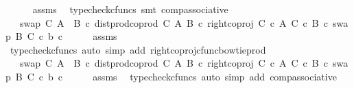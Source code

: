 \begin{isabellebody}
\ \ \ \ \isamarkupfalse%
\ assms\ \isamarkupfalse%
\ {\isacharparenleft}{\kern0pt}typecheck{\isacharunderscore}{\kern0pt}cfuncs{\isacharcomma}{\kern0pt}\ smt\ comp{\isacharunderscore}{\kern0pt}associative{}{\isacharparenright}{\kern0pt}\isanewline
\ \ \isamarkupfalse%
\ \isamarkupfalse%
\ {\isachardoublequoteopen}{\isachardot}{\kern0pt}{\isachardot}{\kern0pt}{\isachardot}{\kern0pt}\ {\isacharequal}{\kern0pt}\ swap\ C\ {\isacharparenleft}{\kern0pt}A\ {\isasymCoprod}\ B{\isacharparenright}{\kern0pt}\ {\isasymcirc}\isactrlsub c\ dist{\isacharunderscore}{\kern0pt}prod{\isacharunderscore}{\kern0pt}coprod\ C\ A\ B\ {\isasymcirc}\isactrlsub c\ {\isacharparenleft}{\kern0pt}right{\isacharunderscore}{\kern0pt}coproj\ {\isacharparenleft}{\kern0pt}C\ {\isasymtimes}\isactrlsub c\ A{\isacharparenright}{\kern0pt}\ {\isacharparenleft}{\kern0pt}C\ {\isasymtimes}\isactrlsub c\ B{\isacharparenright}{\kern0pt}\ {\isasymcirc}\isactrlsub c\ swap\ B\ C{\isacharparenright}{\kern0pt}\ {\isasymcirc}\isactrlsub c\ {\isasymlangle}b{\isacharcomma}{\kern0pt}\ c{\isasymrangle}{\isachardoublequoteclose}\isanewline
\ \ \ \ \isamarkupfalse%
\ assms\ \isamarkupfalse%
\ {\isacharparenleft}{\kern0pt}typecheck{\isacharunderscore}{\kern0pt}cfuncs{\isacharcomma}{\kern0pt}\ auto\ simp\ add{\isacharcolon}{\kern0pt}\ right{\isacharunderscore}{\kern0pt}coproj{\isacharunderscore}{\kern0pt}cfunc{\isacharunderscore}{\kern0pt}bowtie{\isacharunderscore}{\kern0pt}prod{\isacharparenright}{\kern0pt}\isanewline
\ \ \isamarkupfalse%
\ \isamarkupfalse%
\ {\isachardoublequoteopen}{\isachardot}{\kern0pt}{\isachardot}{\kern0pt}{\isachardot}{\kern0pt}\ {\isacharequal}{\kern0pt}\ swap\ C\ {\isacharparenleft}{\kern0pt}A\ {\isasymCoprod}\ B{\isacharparenright}{\kern0pt}\ {\isasymcirc}\isactrlsub c\ dist{\isacharunderscore}{\kern0pt}prod{\isacharunderscore}{\kern0pt}coprod\ C\ A\ B\ {\isasymcirc}\isactrlsub c\ right{\isacharunderscore}{\kern0pt}coproj\ {\isacharparenleft}{\kern0pt}C\ {\isasymtimes}\isactrlsub c\ A{\isacharparenright}{\kern0pt}\ {\isacharparenleft}{\kern0pt}C\ {\isasymtimes}\isactrlsub c\ B{\isacharparenright}{\kern0pt}\ {\isasymcirc}\isactrlsub c\ swap\ B\ C\ {\isasymcirc}\isactrlsub c\ {\isasymlangle}b{\isacharcomma}{\kern0pt}\ c{\isasymrangle}{\isachardoublequoteclose}\isanewline
\ \ \ \ \isamarkupfalse%
\ assms\ \isamarkupfalse%
\ {\isacharparenleft}{\kern0pt}typecheck{\isacharunderscore}{\kern0pt}cfuncs{\isacharcomma}{\kern0pt}\ auto\ simp\ add{\isacharcolon}{\kern0pt}\ comp{\isacharunderscore}{\kern0pt}associative{}{\isacharparenright}{\kern0pt}\isanewline

\end{isabellebody}
